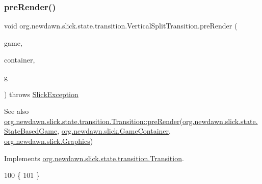 \subsubsection{\texorpdfstring{pre\+Render()}{preRender()}}
{\footnotesize\ttfamily void org.\+newdawn.\+slick.\+state.\+transition.\+Vertical\+Split\+Transition.\+pre\+Render (\begin{DoxyParamCaption}\item[{\mbox{\hyperlink{classorg_1_1newdawn_1_1slick_1_1state_1_1_state_based_game}{State\+Based\+Game}}}]{game,  }\item[{\mbox{\hyperlink{classorg_1_1newdawn_1_1slick_1_1_game_container}{Game\+Container}}}]{container,  }\item[{\mbox{\hyperlink{classorg_1_1newdawn_1_1slick_1_1_graphics}{Graphics}}}]{g }\end{DoxyParamCaption}) throws \mbox{\hyperlink{classorg_1_1newdawn_1_1slick_1_1_slick_exception}{Slick\+Exception}}\hspace{0.3cm}{\ttfamily [inline]}}

\begin{DoxySeeAlso}{See also}
\mbox{\hyperlink{interfaceorg_1_1newdawn_1_1slick_1_1state_1_1transition_1_1_transition_ab8b0668c059830d938575d1a0b08bd93}{org.\+newdawn.\+slick.\+state.\+transition.\+Transition\+::pre\+Render}}(\mbox{\hyperlink{classorg_1_1newdawn_1_1slick_1_1state_1_1_state_based_game}{org.\+newdawn.\+slick.\+state.\+State\+Based\+Game}}, \mbox{\hyperlink{classorg_1_1newdawn_1_1slick_1_1_game_container}{org.\+newdawn.\+slick.\+Game\+Container}}, \mbox{\hyperlink{classorg_1_1newdawn_1_1slick_1_1_graphics}{org.\+newdawn.\+slick.\+Graphics}}) 
\end{DoxySeeAlso}


Implements \mbox{\hyperlink{interfaceorg_1_1newdawn_1_1slick_1_1state_1_1transition_1_1_transition_ab8b0668c059830d938575d1a0b08bd93}{org.\+newdawn.\+slick.\+state.\+transition.\+Transition}}.


\begin{DoxyCode}
100                                               \{
101     \}
\end{DoxyCode}
\mbox{\label{classorg_1_1newdawn_1_1slick_1_1state_1_1transition_1_1_vertical_split_transition_a72184556b43e32b01f0436d2ea8b0723}} 
